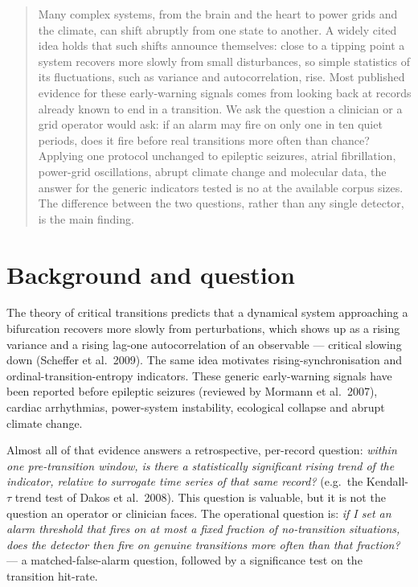\documentclass[aip,cha,preprint,amsmath,amssymb]{revtex4-2}
\begin{document}
\begin{quotation}
Many complex systems, from the brain and the heart to power grids and
the climate, can shift abruptly from one state to another. A widely
cited idea holds that such shifts announce themselves: close to a
tipping point a system recovers more slowly from small disturbances, so
simple statistics of its fluctuations, such as variance and
autocorrelation, rise. Most published evidence for these early-warning
signals comes from looking back at records already known to end in a
transition. We ask the question a clinician or a grid operator would
ask: if an alarm may fire on only one in ten quiet periods, does it
fire before real transitions more often than chance? Applying one
protocol unchanged to epileptic seizures, atrial fibrillation,
power-grid oscillations, abrupt climate change and molecular data, the
answer for the generic indicators tested is no at the available corpus
sizes. The difference between the two questions, rather than any single
detector, is the main finding.
\end{quotation}

\section{Background and question}\label{sec:background}

The theory of critical transitions predicts that a dynamical system
approaching a bifurcation recovers more slowly from perturbations, which
shows up as a rising variance and a rising lag-one autocorrelation of an
observable --- critical slowing down (Scheffer et al.\ 2009). The same
idea motivates rising-synchronisation and ordinal-transition-entropy
indicators. These generic early-warning signals have been reported
before epileptic seizures (reviewed by Mormann et al.\ 2007), cardiac arrhythmias, power-system
instability, ecological collapse and abrupt climate change.

Almost all of that evidence answers a retrospective, per-record
question: \emph{within one pre-transition window, is there a
statistically significant rising trend of the indicator, relative to
surrogate time series of that same record?} (e.g.\ the Kendall-$\tau$
trend test of Dakos et al.\ 2008). This question is valuable, but it is
not the question an operator or clinician faces. The operational
question is: \emph{if I set an alarm threshold that fires on at most a
fixed fraction of no-transition situations, does the detector then fire
on genuine transitions more often than that fraction?} --- a
matched-false-alarm question, followed by a significance test on the
transition hit-rate.
\end{document}
